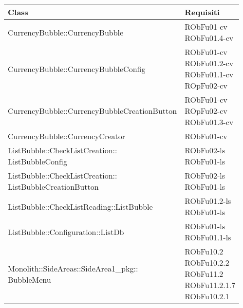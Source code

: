 \begin{center}
\begin{longtable}{|
*{1}{>{\centering\arraybackslash}m{7.5cm}|}
*{1}{>{\centering\arraybackslash}m{2.5cm}|}}
\hline \textbf{Class} & \textbf{Requisiti}\\
\hline \endhead
\hline \endfoot

CurrencyBubble::CurrencyBubble & \makecell{RObFu01-cv
\\RObFu01.4-cv
\\}\\\hline
CurrencyBubble::CurrencyBubbleConfig & \makecell{RObFu01-cv
\\RObFu01.2-cv
\\RObFu01.1-cv
\\ROpFu02-cv
\\}\\\hline
CurrencyBubble::CurrencyBubbleCreationButton & \makecell{RObFu01-cv
\\ROpFu02-cv
\\RObFu01.3-cv
\\}\\\hline
CurrencyBubble::CurrencyCreator & \makecell{RObFu01-cv
\\}\\\hline
\makecell[l]{ListBubble::CheckListCreation:: \\ \hfill ListBubbleConfig} & \makecell{RObFu02-ls
\\RObFu01-ls
\\}\\\hline
\makecell[l]{ListBubble::CheckListCreation:: \\ \hfill ListBubbleCreationButton} & \makecell{RObFu02-ls
\\RObFu01-ls
\\}\\\hline
ListBubble::CheckListReading::ListBubble & \makecell{RObFu01.2-ls
\\RObFu01-ls
\\}\\\hline
ListBubble::Configuration::ListDb & \makecell{RObFu01-ls
\\RObFu01.1-ls
\\}\\\hline
\makecell[l]{Monolith::SideAreas::SideArea1\_pkg:: \\ \hfill BubbleMenu} & \makecell{RObFu10.2
\\RObFu10.2.2
\\RObFu11.2
\\RObFu11.2.1.7
\\RObFu10.2.1
}
\end{longtable}
\end{center}
